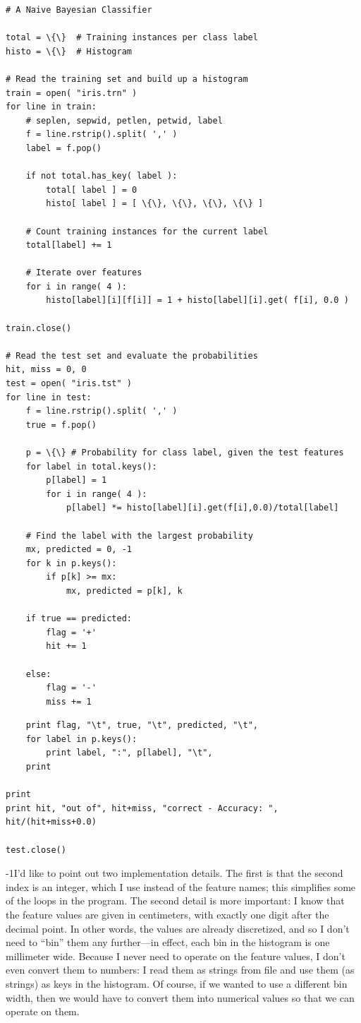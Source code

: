 \begin{verbatim}
# A Naive Bayesian Classifier

total = \{\}  # Training instances per class label
histo = \{\}  # Histogram

# Read the training set and build up a histogram
train = open( "iris.trn" )
for line in train:
    # seplen, sepwid, petlen, petwid, label
    f = line.rstrip().split( ',' )
    label = f.pop()

    if not total.has_key( label ):
        total[ label ] = 0
        histo[ label ] = [ \{\}, \{\}, \{\}, \{\} ]

    # Count training instances for the current label
    total[label] += 1

    # Iterate over features
    for i in range( 4 ):
        histo[label][i][f[i]] = 1 + histo[label][i].get( f[i], 0.0 )
        
train.close()

# Read the test set and evaluate the probabilities
hit, miss = 0, 0
test = open( "iris.tst" )
for line in test:
    f = line.rstrip().split( ',' )
    true = f.pop()

    p = \{\} # Probability for class label, given the test features
    for label in total.keys():
        p[label] = 1
        for i in range( 4 ):
            p[label] *= histo[label][i].get(f[i],0.0)/total[label]

    # Find the label with the largest probability
    mx, predicted = 0, -1
    for k in p.keys():
        if p[k] >= mx:
            mx, predicted = p[k], k

    if true == predicted:
        flag = '+'
        hit += 1

    else:
        flag = '-'
        miss += 1
 \end{verbatim}

\begin{verbatim}       
    print flag, "\t", true, "\t", predicted, "\t",
    for label in p.keys():
        print label, ":", p[label], "\t",
    print

print
print hit, "out of", hit+miss, "correct - Accuracy: ", hit/(hit+miss+0.0)

test.close()
\end{verbatim}

\looseness-1I'd like to point out two implementation details.  The first is that
the second index is an integer, which I use instead of the feature
names; this simplifies some of the loops in the program. The second
detail is more important: I know that the feature values are given in
centimeters, with exactly one digit after the decimal point. In other
words, the values are already discretized, and so I don't need to
``bin'' them any further---in effect, each bin in the histogram is one
millimeter wide.  Because I never need to operate on the feature
values, I don't even convert them to numbers: I read them as strings
from file and use them (as strings) as keys in the histogram. Of
course, if we wanted to use a different bin width, then we would have
to convert them into numerical values so that we can operate on them.

